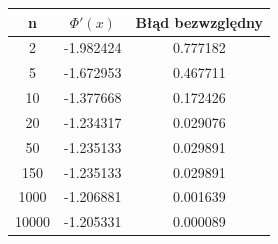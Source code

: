\documentclass[a4paper]{article}
\begin{document}
    \begin{center}
        \begin{tabular}{|c|c|c|} 
            \hline
            n & $\Phi'(x)$ & Błąd bezwzględny \\
            \hline
            2 & -1.982424 & 0.777182 \\
            \hline
            5 & -1.672953 & 0.467711 \\
            \hline
            10 & -1.377668 & 0.172426 \\
            \hline
            20 & -1.234317 & 0.029076 \\
            \hline
            50 & -1.235133 & 0.029891 \\
            \hline
            150 & -1.235133 & 0.029891 \\
            \hline
            1000 & -1.206881 & 0.001639 \\
            \hline
            10000 & -1.205331 & 0.000089 \\
            \hline
        \end{tabular}
    \end{center}
\end{document}

